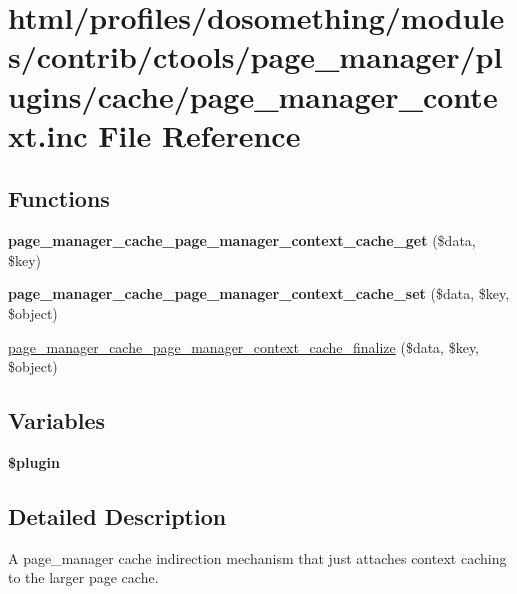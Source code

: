 \hypertarget{page__manager__context_8inc}{
\section{html/profiles/dosomething/modules/contrib/ctools/page\_\-manager/plugins/cache/page\_\-manager\_\-context.inc File Reference}
\label{page__manager__context_8inc}
}
\subsection*{Functions}
\begin{DoxyCompactItemize}
\item 
\hypertarget{page__manager__context_8inc_aca428457dc4a4fac37f3529602090915}{
{\bfseries page\_\-manager\_\-cache\_\-page\_\-manager\_\-context\_\-cache\_\-get} (\$data, \$key)}
\label{page__manager__context_8inc_aca428457dc4a4fac37f3529602090915}

\item 
\hypertarget{page__manager__context_8inc_a6a31a03250cf8f99c91dc3843fae33ae}{
{\bfseries page\_\-manager\_\-cache\_\-page\_\-manager\_\-context\_\-cache\_\-set} (\$data, \$key, \$object)}
\label{page__manager__context_8inc_a6a31a03250cf8f99c91dc3843fae33ae}

\item 
\hyperlink{page__manager__context_8inc_a6ab0606534bbea671ad4dbe5a103d36d}{page\_\-manager\_\-cache\_\-page\_\-manager\_\-context\_\-cache\_\-finalize} (\$data, \$key, \$object)
\end{DoxyCompactItemize}
\subsection*{Variables}
\begin{DoxyCompactItemize}
\item 
{\bfseries \$plugin}
\end{DoxyCompactItemize}


\subsection{Detailed Description}
A page\_\-manager cache indirection mechanism that just attaches context caching to the larger page cache. 

